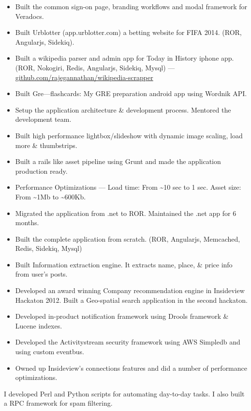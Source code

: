 \documentclass{resume}
\begin{document}
\begin{itemize} \itemsep1pt \parskip0pt
  \item Built the common sign-on page, branding workflows and modal framework for Veradocs.
  \item Built Urblotter (app.urblotter.com) a betting website for FIFA 2014. (ROR, Angularjs, Sidekiq).
  \item Built a wikipedia parser and admin app for Today in History iphone app. (ROR, Nokogiri, Redis, Angularjs, Sidekiq, Mysql) --- \url{github.com/rajegannathan/wikipedia-scrapper}
  \item Built Gre---flashcards: My GRE preparation android app using Wordnik API\@.
\end{itemize}
\begin{itemize} \itemsep1pt \parskip0pt
  \item Setup the application architecture \& development process. Mentored the development team.
  \item Built high performance lightbox/slideshow with dynamic image scaling, load more \& thumbstrips.
  \item Built a rails like asset pipeline using Grunt and made the application production ready.
  \item Performance Optimizations --- Load time: From \textasciitilde10 sec to 1 sec.  Asset size: From \textasciitilde1Mb to \textasciitilde600Kb.
\end{itemize}
\begin{itemize} \itemsep1pt \parskip0pt
  \item Migrated the application from .net to ROR.  Maintained the .net app for 6 months.
  \item Built the complete application from scratch. (ROR, Angularjs, Memcached, Redis, Sidekiq, Mysql)
  \item Built Information extraction engine. It extracts name, place, \& price info from user's posts.
\end{itemize}
\begin{itemize} \itemsep1pt \parskip0pt
  \item Developed an award winning Company recommendation engine in Insideview Hackaton 2012.  Built a Geo-spatial search application in the second hackaton.
  \item Developed in-product notification framework using Drools framework \& Lucene indexes.
  \item Developed the Activitystream security framework using AWS Simpledb and using custom eventbus.
  \item Owned up Insideview's connections features and did a number of performance optimizations.
\end{itemize}
I developed Perl and Python  scripts for automating day-to-day tasks.  I also built a RPC framework for spam filtering.
 
\end{document}
